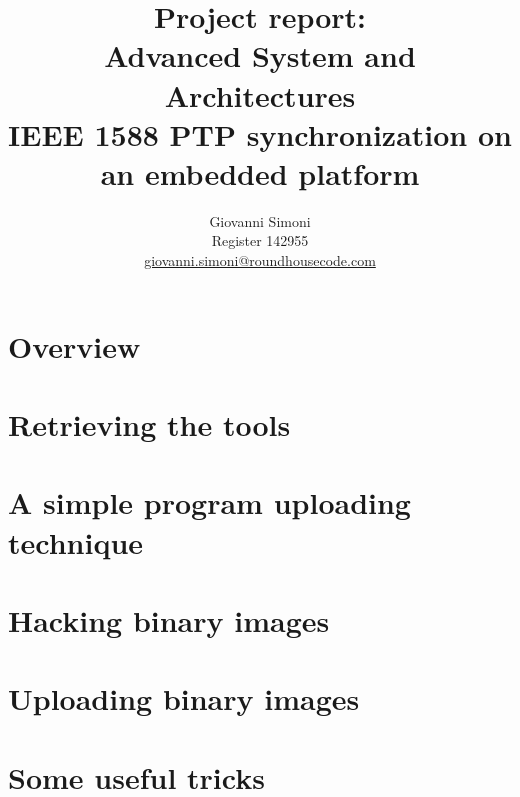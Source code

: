 \documentclass[10pt,a4paper]{article}
\title {
    Project report:\\
    Advanced System and Architectures\\
    IEEE 1588 PTP synchronization on an embedded platform
}
\author{
    Giovanni Simoni\\
    Register 142955\\
    \href{mailto:giovanni.simoni@roundhousecode.com}
         {giovanni.simoni@roundhousecode.com}
}
\begin{document}
\maketitle

%
%
%
    \tableofcontents
    \newpage

    \section{ Overview } \label{sec:Overview}
    

    \section{ Retrieving the tools } \label{sec:GetTools}
    

    \section{ A simple program uploading technique } \label{sec:Upload}
    

    \section{ Hacking binary images } \label{sec:HackImages}
    

    \section{ Uploading binary images } \label{sec:UploadImages}
    


    \section{ Some useful tricks } \label{sec:Tricks}
    

\end{document}
